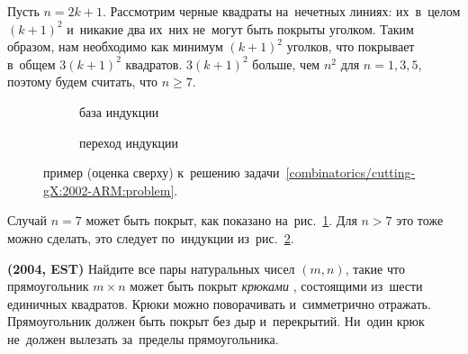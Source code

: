 \ifincludesolutions
Пусть $n = 2 k + 1$.
Рассмотрим черные квадраты на~нечетных линиях: их~в~целом $(k + 1)^2$ и~никакие
два их~них не~могут быть покрыты уголком.
Таким образом, нам необходимо как минимум $(k + 1)^2$ уголков, что покрывает
в~общем $3 (k + 1)^2$ квадратов.
$3 (k + 1)^2$ больше, чем $n^2$ для $n = 1, 3, 5$, поэтому будем считать, что
$n \geq 7$.
\begin{figure}[ht]\begin{center}
\strut\hfill
    \begin{subfigure}{3.5cm}
    \caption{база индукции}
    \label{combinatorics/cutting-gX:2002-ARM:solution:fig:7}
    \end{subfigure}
\hfill
    \begin{subfigure}{4.5cm}
    \caption{переход индукции}
    \label{combinatorics/cutting-gX:2002-ARM:solution:fig:p2}
    \end{subfigure}
\hfill\strut\par
\caption{пример (оценка сверху)
к~решению задачи~\ref{combinatorics/cutting-gX:2002-ARM:problem}.}%
\label{combinatorics/cutting-gX:2002-ARM:solution:fig}
\end{center}\end{figure}
\par
Случай $n = 7$ может быть покрыт, как показано
на~рис.~\ref{combinatorics/cutting-gX:2002-ARM:solution:fig:7}.
Для $n > 7$ это тоже можно сделать, это следует по~индукции
из~рис.~\ref{combinatorics/cutting-gX:2002-ARM:solution:fig:p2}.
\fi %

\begin{problems}

\item\textbf{(2004, EST)}%
\label{combinatorics/cutting-gX:2004-EST:problem}
Найдите все пары натуральных чисел $(m, n)$, такие что прямоугольник
$m \times n$ может быть покрыт
\emph{крюками}
,
состоящими из~шести единичных квадратов.
Крюки можно поворачивать и~симметрично отражать.
Прямоугольник должен быть покрыт без дыр и~перекрытий.
Ни~один крюк не~должен вылезать за~пределы прямоугольника.

\end{problems}


